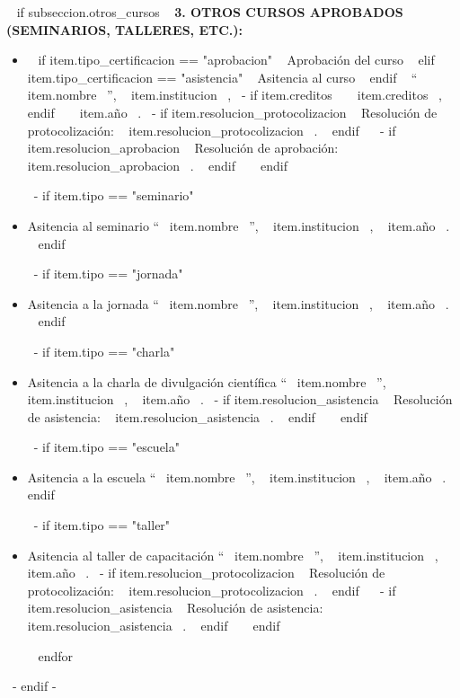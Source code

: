     ~{ if subseccion.otros_cursos }~
      \textbf{3. OTROS CURSOS APROBADOS (SEMINARIOS, TALLERES, ETC.):}
      \begin{itemize}
      ~{ for item in subseccion.otros_cursos }~
        ~{- if item.tipo == "curso" }~
          \item ~{ if item.tipo_certificacion == "aprobacion" }~ Aprobación del curso ~{ elif item.tipo_certificacion == "asistencia" }~ Asitencia al curso ~{ endif }~
                ``~{{ item.nombre }}~'', ~{{ item.institucion }}~,
                ~{- if item.creditos }~ ~{{ item.creditos }}~, ~{ endif }~
                ~{{ item.año }}~.
                ~{- if item.resolucion_protocolizacion }~ Resolución de protocolización: ~{{ item.resolucion_protocolizacion }}~. ~{ endif }~
                ~{- if item.resolucion_aprobacion }~ Resolución de aprobación: ~{{ item.resolucion_aprobacion }}~. ~{ endif }~
          \espacioEntreItems{}
        ~{ endif }~

        ~{- if item.tipo == "seminario" }~
          \item Asitencia al seminario ``~{{ item.nombre }}~'', ~{{ item.institucion }}~, ~{{ item.año }}~.
          \espacioEntreItems{}
        ~{ endif }~

        ~{- if item.tipo == "jornada" }~
          \item Asitencia a la jornada ``~{{ item.nombre }}~'', ~{{ item.institucion }}~, ~{{ item.año }}~.
          \espacioEntreItems{}
        ~{ endif }~

        ~{- if item.tipo == "charla" }~
          \item Asitencia a la charla de divulgación científica ``~{{ item.nombre }}~'', ~{{ item.institucion }}~, ~{{ item.año }}~.
                ~{- if item.resolucion_asistencia }~ Resolución de asistencia: ~{{ item.resolucion_asistencia }}~. ~{ endif }~
          \espacioEntreItems{}
        ~{ endif }~

        ~{- if item.tipo == "escuela" }~
          \item Asitencia a la escuela ``~{{ item.nombre }}~'', ~{{ item.institucion }}~, ~{{ item.año }}~.
          \espacioEntreItems{}
        ~{ endif }~

        ~{- if item.tipo == "taller" }~
          \item Asitencia al taller de capacitación ``~{{ item.nombre }}~'', ~{{ item.institucion }}~, ~{{ item.año }}~.
                ~{- if item.resolucion_protocolizacion }~ Resolución de protocolización: ~{{ item.resolucion_protocolizacion }}~. ~{ endif }~
                ~{- if item.resolucion_asistencia }~ Resolución de asistencia: ~{{ item.resolucion_asistencia }}~. ~{ endif }~
          \espacioEntreItems{}
        ~{ endif }~

      ~{ endfor }~
      \end{itemize}
      \espacioEntreSubSecciones{}
    ~{- endif -}~

